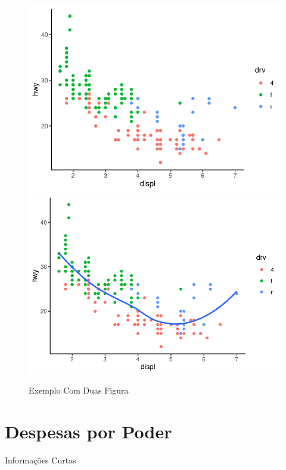 	\begin{figure}[h]
		\caption{Exemplo Com Duas Figura}
		\includegraphics[width=\linewidth]{fig/plot}
		\includegraphics[width=\linewidth]{fig/plot2}
	\end{figure}
	
	\section{Despesas por Poder}
	
	\lipsum[1-2]

	\begin{smbox}{Informações Curtas}
		\lipsum[1]
	\end{smbox}

